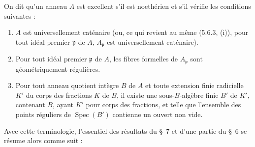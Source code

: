 \begin{definition}[7.8.2]
\label{IV.2.s7.8.2-fr}
On dit qu'un anneau $A$ est excellent s'il est noethérien et s'il
vérifie les conditions suivantes :
\begin{enumerate}
\item[\emph{(i)}] $A$ est universellement caténaire (ou, ce qui revient au même
(5.6.3, (i)), pour tout idéal premier $\mathfrak p$ de $A$,
$A_{\mathfrak p}$ est universellement caténaire).
\item[\emph{(ii)}] Pour tout idéal premier $\mathfrak p$ de $A$, les fibres
formelles de $A_{\mathfrak p}$ sont géométriquement régulières.
\item[\emph{(iii)}] Pour tout anneau quotient intègre $B$ de $A$ et toute
extension finie radicielle $K'$ du corps des fractions $K$ de $B$, il existe
une sous-$B$-algèbre finie $B'$ de $K'$, contenant $B$, ayant $K'$ pour corps
des fractions, et telle que l'ensemble des points réguliers de
$\operatorname{Spec}(B')$ contienne un ouvert non vide.
\end{enumerate}
\upshape
Avec cette terminologie, l'essentiel des résultats du \S~7 et d'une partie du
\S~6 se résume alors comme suit :
\end{definition}

